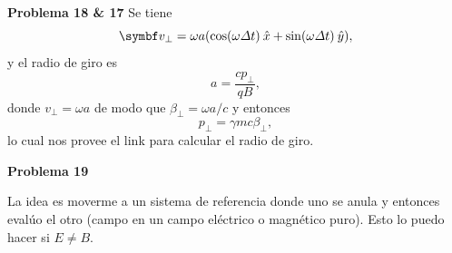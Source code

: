 \documentclass[10pt,oneside]{CBFT_book}
\begin{document}
\begin{ejemplo}{\bf Problema 18 \& 17}
Se tiene
\[
	\vb{v}_\perp = \omega a ( \cos(\omega\Delta t) \xver + \sin(\omega\Delta t)\yver ),
\]
y el radio de giro es
\[
	a = \frac{ c p_\perp }{ q B },
\]
donde $ v_\perp = \omega a $ de modo que $\beta_\perp = \omega a / c $ y entonces
\[
	p_\perp = \gamma m c \beta_\perp,
\]
lo cual nos provee el link para calcular el radio de giro.
 
\end{ejemplo}

\begin{ejemplo}{\bf Problema 19}

La idea es moverme a un sistema de referencia donde uno se anula y entonces evalúo el otro
(campo en un campo eléctrico o magnético puro). Esto lo puedo hacer si $E \neq B$.

\end{ejemplo}


\end{document}
